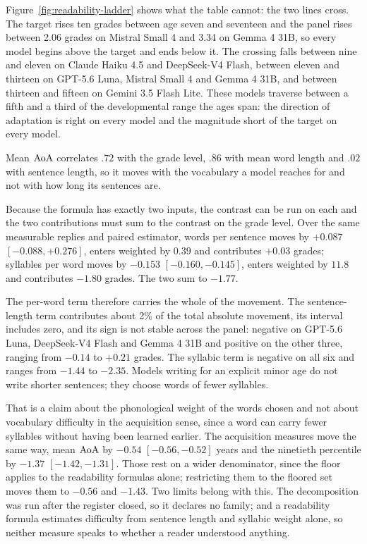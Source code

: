 

Figure~\ref{fig:readability-ladder} shows what the table cannot: the two lines
cross. The target rises ten grades between age seven and seventeen and the panel
rises between 2.06 grades on Mistral Small 4 and 3.34 on Gemma 4 31B, so every
model begins above the target and ends below it. The crossing falls between nine
and eleven on Claude Haiku 4.5 and DeepSeek-V4 Flash, between eleven and thirteen
on GPT-5.6 Luna, Mistral Small 4 and Gemma 4 31B, and between thirteen and
fifteen on Gemini 3.5 Flash Lite. These models traverse between a fifth and a
third of the developmental range the ages span: the direction of adaptation is
right on every model and the magnitude short of the target on every model.

Mean $\mathrm{AoA}$ correlates $.72$ with the grade level, $.86$ with mean word length
and $.02$ with sentence length, so it moves with the vocabulary a model reaches
for and not with how long its sentences are.

Because the formula has exactly two inputs, the contrast can be run on each and
the two contributions must sum to the contrast on the grade level. Over the same
measurable replies and paired estimator, words per sentence moves by $+0.087$
$[-0.088, +0.276]$, enters weighted by $0.39$ and contributes $+0.03$ grades;
syllables per word moves by $-0.153$ $[-0.160, -0.145]$, enters weighted by
$11.8$ and contributes $-1.80$ grades. The two sum to $-1.77$.

The per-word term therefore carries the whole of the movement. The
sentence-length term contributes about 2\% of the total absolute movement, its
interval includes zero, and its sign is not stable across the panel: negative on
GPT-5.6 Luna, DeepSeek-V4 Flash and Gemma 4 31B and positive on the other three,
ranging from $-0.14$ to $+0.21$ grades. The syllabic term is negative on all six
and ranges from $-1.44$ to $-2.35$. Models writing for an explicit minor age do
not write shorter sentences; they choose words of fewer syllables.

That is a claim about the phonological weight of the words chosen and not about
vocabulary difficulty in the acquisition sense, since a word can carry fewer
syllables without having been learned earlier. The acquisition measures move the
same way, mean $\mathrm{AoA}$ by $-0.54$ $[-0.56, -0.52]$ years and the ninetieth
percentile by $-1.37$ $[-1.42, -1.31]$. Those rest on a wider denominator, since
the floor applies to the readability formulas alone; restricting them to the
floored set moves them to $-0.56$ and $-1.43$. Two limits belong with this. The
decomposition was run after the register closed, so it declares no family; and a
readability formula estimates difficulty from sentence length and syllabic weight
alone, so neither measure speaks to whether a reader understood anything.


